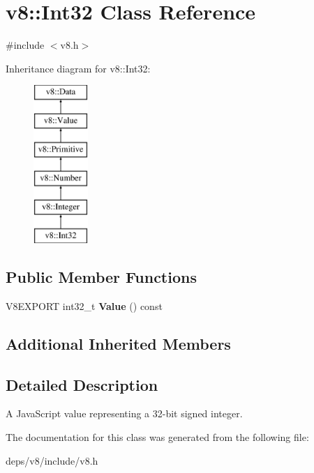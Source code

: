 \hypertarget{classv8_1_1_int32}{}\section{v8\+:\+:Int32 Class Reference}
\label{classv8_1_1_int32}


{\ttfamily \#include $<$v8.\+h$>$}

Inheritance diagram for v8\+:\+:Int32\+:\begin{figure}[H]
\begin{center}
\leavevmode
\includegraphics[height=6.000000cm]{classv8_1_1_int32}
\end{center}
\end{figure}
\subsection*{Public Member Functions}
\begin{DoxyCompactItemize}
\item 
\hypertarget{classv8_1_1_int32_aaa0479d5559cdfcbfe81a7e23c27d06d}{}V8\+E\+X\+P\+O\+R\+T int32\+\_\+t {\bfseries Value} () const \label{classv8_1_1_int32_aaa0479d5559cdfcbfe81a7e23c27d06d}

\end{DoxyCompactItemize}
\subsection*{Additional Inherited Members}


\subsection{Detailed Description}
A Java\+Script value representing a 32-\/bit signed integer. 

The documentation for this class was generated from the following file\+:\begin{DoxyCompactItemize}
\item 
deps/v8/include/v8.\+h\end{DoxyCompactItemize}
